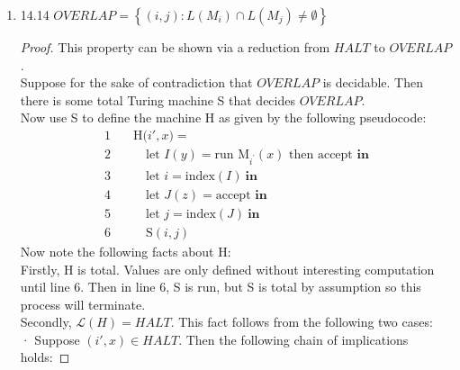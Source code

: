 \documentclass[10pt]{article}
\begin{document}
\begin{enumerate}[label={}]
\begin{proof}
                  Thus we know that $\mathcal{L}(H)=H A L T$ and $H$ is total. In other words, $H$ decides $H A L T$. However, HALT is known to be undecidable (see Theorem 14.7 from the textbook). Thus, there is a contradiction, and the assumption that $DIFFERENT$ is decidable must be false. Therefore, $DIFFERENT$ is in fact undecidable.

            \end{proof}

      \item 14.14 $OVERLAP=\left\{(i, j): L\left(M_i\right) \cap L\left(M_j\right) \neq \emptyset\right\}$

            \begin{proof}
                  This property can be shown via a reduction from $HALT$ to $OVERLAP$.\\
                  Suppose for the sake of contradiction that $OVERLAP$ is decidable.
                  Then there is some total Turing machine S that decides $OVERLAP$.\\
                  Now use S to define the machine H as given by the following pseudocode:
                  $$\begin{aligned}
                              1 \quad & \text{H(}i', x\text{)} =                                                                       \\
                              2 \quad & \quad \text{let } I(y) = \text{run } \text{M}_{i^{\prime}}(x) \text{ then accept } \textbf{in} \\
                              3 \quad & \quad \text{let } i = \text{index}(I) \ \textbf{in}                                            \\
                              4 \quad & \quad \text{let } J(z) = \text{accept } \textbf{in}                                            \\
                              5 \quad & \quad \text{let } j = \text{index}(J) \ \textbf{in}                                            \\
                              6 \quad & \quad \text{S}(i, j)
                        \end{aligned}$$
                  Now note the following facts about H:\\
                  Firstly, H is total. Values are only defined without interesting computation
                  until line 6. Then in line 6, S is run, but S is total by assumption so this process
                  will terminate.\\
                  Secondly, $\mathcal{L}(H)=H A L T$. This fact follows from the following two cases:\\
                  · Suppose $(i', x) \in H A L T$. Then the following chain of implications holds:


\end{proof}
\end{enumerate}
\end{document}

